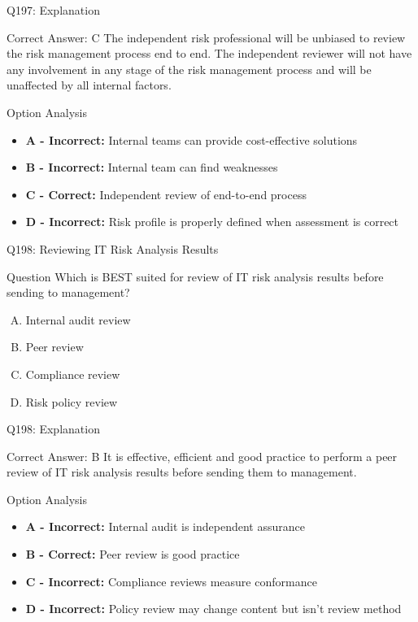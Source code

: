 \documentclass{beamer}
\begin{document}
	\begin{frame}{Q197: Explanation}
		\begin{block}{Correct Answer: C}
			The independent risk professional will be unbiased to review the risk management process end to end. The independent reviewer will not have any involvement in any stage of the risk management process and will be unaffected by all internal factors.
		\end{block}
		\begin{block}{Option Analysis}
			\begin{itemize}
				\item \textbf{A - Incorrect:} Internal teams can provide cost-effective solutions
				\item \textbf{B - Incorrect:} Internal team can find weaknesses
				\item \textbf{C - Correct:} Independent review of end-to-end process
				\item \textbf{D - Incorrect:} Risk profile is properly defined when assessment is correct
			\end{itemize}
		\end{block}
	\end{frame}
	
	\begin{frame}{Q198: Reviewing IT Risk Analysis Results}
		\begin{block}{Question}
			Which is BEST suited for review of IT risk analysis results before sending to management?
		\end{block}
		\begin{enumerate}[(A)]
			\item Internal audit review
			\item Peer review
			\item Compliance review
			\item Risk policy review
		\end{enumerate}
	\end{frame}
	
	\begin{frame}{Q198: Explanation}
		\begin{block}{Correct Answer: B}
			It is effective, efficient and good practice to perform a peer review of IT risk analysis results before sending them to management.
		\end{block}
		\begin{block}{Option Analysis}
			\begin{itemize}
				\item \textbf{A - Incorrect:} Internal audit is independent assurance
				\item \textbf{B - Correct:} Peer review is good practice
				\item \textbf{C - Incorrect:} Compliance reviews measure conformance
				\item \textbf{D - Incorrect:} Policy review may change content but isn't review method
			\end{itemize}
		\end{block}
	\end{frame}
	
\end{document}
